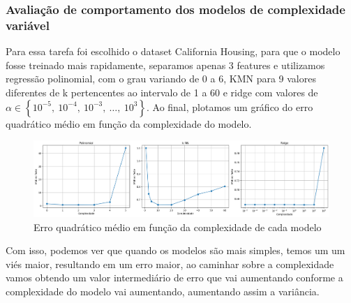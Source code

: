 \documentclass[conference]{IEEEtran}
\begin{document}
\subsubsection{Avaliação de comportamento dos modelos de complexidade variável}
Para essa tarefa foi escolhido o dataset California Housing, para que o modelo fosse treinado mais rapidamente, separamos apenas 3 features e utilizamos regressão polinomial, com o grau variando de 0 a 6, KMN para 9 valores diferentes de k pertencentes ao intervalo de 1 a 60 e ridge com valores de $\alpha \in \left\{ 10^{-5},\ 10^{-4},\ 10^{-3},\ \ldots,\ 10^{3} \right\}$. Ao final, plotamos um gráfico do erro quadrático médio em função da complexidade do modelo.

  \begin{figure}[H]
    \centerline{\includegraphics[width=1\linewidth]{../output/MSE.png}}
    \caption{Erro quadrático médio em função da complexidade de cada modelo}
    \label{fig:MSE}
  \end{figure}
Com isso, podemos ver que quando os modelos são mais simples, temos um um viés maior, resultando em um erro maior, ao caminhar sobre a complexidade vamos obtendo um valor intermediário de erro que vai aumentando conforme a complexidade do modelo vai aumentando, aumentando assim a variância.
\end{document}
